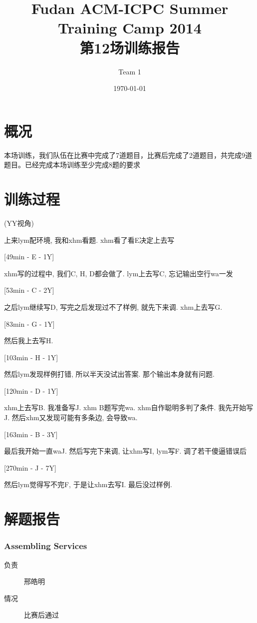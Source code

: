 \documentclass[a4paper, 11pt, nofonts, nocap, fancyhdr]{ctexart}
\title{Fudan ACM-ICPC Summer Training Camp 2014\\第12场训练报告}
\author{Team 1}
\date{\today}
\newcommand{\problem}[1]{\subsubsection{#1}}
\begin{document}
\maketitle

\section{概况}

本场训练，我们队伍在比赛中完成了7道题目，比赛后完成了2道题目，共完成9道题目。已经完成本场训练至少完成8题的要求

\section{训练过程}

(YY视角)

上来lym配环境, 我和xhm看题.	xhm看了看E决定上去写

[49min - E - 1Y]

xhm写的过程中, 我们C, H, D都会做了. lym上去写C, 忘记输出空行wa一发

[53min - C - 2Y]

之后lym继续写D, 写完之后发现过不了样例, 就先下来调. xhm上去写G. 

[83min - G - 1Y]

然后我上去写H.

[103min - H - 1Y]

然后lym发现样例打错, 所以半天没试出答案. 那个输出本身就有问题.

[120min - D - 1Y]

xhm上去写B. 我准备写J. xhm B题写完wa. xhm自作聪明多判了条件. 我先开始写J. 然后xhm又发现可能有多条边, 会导致wa.

[163min - B - 3Y]

最后我开始一直waJ. 然后写完下来调, 让xhm写I, lym写F. 调了若干傻逼错误后

[270min - J - 7Y]

然后lym觉得写不完F, 于是让xhm去写I. 最后没过样例.

\section{解题报告}

\problem{Assembling Services}

\begin{description}
\item[负责] 邢皓明
\item[情况] 比赛后通过
\end{description}
\end{document}
